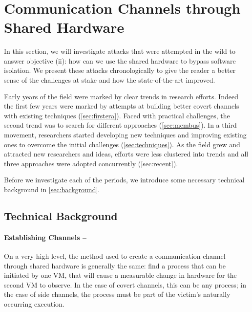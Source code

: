 \documentclass[orivec,envcountsame, a4paper, 11pt]{llncs}
\begin{document}
\section{Communication Channels through Shared Hardware}
\label{sec:attacks}

\paragraph{} In this section, we will investigate attacks that were attempted in the wild to answer objective (ii): how can we use the shared hardware to bypass software isolation. We present these attacks chronologically to give the reader a better sense of the challenges at stake and how the state-of-the-art improved. 

Early years of the field were marked by clear trends in research efforts. Indeed the first few years were marked by attempts at building better covert channels with existing techniques \cite{Ristenpart2009,Xu2011,Zhang2012} (\autoref{sec:firstera}). Faced with practical challenges, the second trend was to search for different approaches \cite{Wu2012,Xiao2013} (\autoref{sec:membus}). In a third movement, researchers started developing new techniques and improving existing ones to overcome the initial challenges \cite{Gruss2016,Irazoqui2015,Liu2015,Yarom2014} (\autoref{sec:techniques}). As the field grew and attracted new researchers and ideas, efforts were less clustered into trends and all three approaches were adopted concurrently \cite{Disselkoen2017,Maurice2015,Pessl2016} (\autoref{sec:recent}).

 Before we investigate each of the periods, we introduce some necessary technical background in \autoref{sec:background}.

\begin{comment}
	- How do these techniques fare in the wild?
	- Present chronologically? With each success describe the next challenge. With each failure, describe what needs to be improved
	- Which studies implemented what, and to which degree of success?
	- Link to current day using Spectre & Meltdown (this is where all the researchers cited here focused in 18/19)
\end{comment}

\subsection{Technical Background}
\label{sec:background}


\paragraph{Establishing Channels --} On a very high level, the method used to create a communication channel through shared hardware is generally the same: find a process that can be initiated by one VM, that will cause a measurable change in hardware for the second VM to observe. In the case of covert channels, this can be any process; in the case of side channels, the process must be part of the victim's naturally occurring execution.
\end{document}
